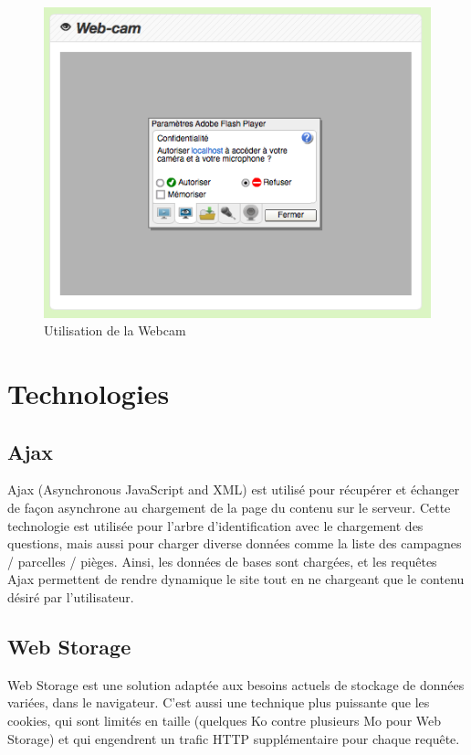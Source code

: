 \documentclass[twoside]{EPURapport}
\begin{document}
		\begin{figure}[h!]
			\centering
			\includegraphics[scale=0.5]{images/lib-webcam.png}
			\caption{Utilisation de la Webcam}
		\end{figure}
	
	\section{Technologies}
	\label{tec}
	
		\subsection{Ajax}
		\label{tec:ajax}
		Ajax (Asynchronous JavaScript and XML) est utilisé pour récupérer et échanger de façon asynchrone au chargement de la page du contenu sur le serveur. Cette technologie est utilisée pour l'arbre d'identification avec le chargement des questions, mais aussi pour charger diverse données comme la liste des campagnes / parcelles / pièges. Ainsi, les données de bases sont chargées, et les requêtes Ajax permettent de rendre dynamique le site tout en ne chargeant que le contenu désiré par l'utilisateur.
		
		\subsection{Web Storage}
		\label{tec:storage}
		Web Storage est une solution adaptée aux besoins actuels de stockage de données variées, dans le navigateur. C'est aussi une technique plus puissante que les cookies, qui sont limités en taille (quelques Ko contre plusieurs Mo pour Web Storage) et qui engendrent un trafic HTTP supplémentaire pour chaque requête.\\
		
\end{document}

